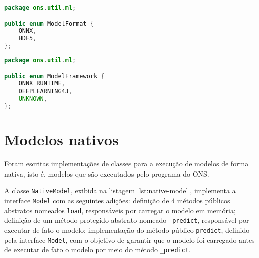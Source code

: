 \begin{lstlisting}[language=Java, caption=Implementação do \textit{enum} ModelFormat, label={lst:modelfr}]
package ons.util.ml;

public enum ModelFormat {
    ONNX,
    HDF5,
};  
\end{lstlisting}

\begin{lstlisting}[language=Java, caption=Implementação do \textit{enum} ModelFramework, label={lst:modelfrm}]
package ons.util.ml;

public enum ModelFramework {
    ONNX_RUNTIME,
    DEEPLEARNING4J,
    UNKNOWN,
};
\end{lstlisting}

\section{Modelos nativos}
\label{appendix-ons-native-model}

Foram escritas implementações de classes para a execução de modelos de forma nativa, isto é, modelos que são executados pelo programa do ONS.

A classe \texttt{NativeModel}, exibida na listagem \ref{lst:native-model}, implementa a interface \texttt{Model} com as seguintes adições: definição de 4 métodos públicos abstratos nomeados \texttt{load}, responsáveis por carregar o modelo em memória; definição de um método protegido abstrato nomeado \texttt{\_predict}, responsável por executar de fato o modelo; implementação do método público \texttt{predict}, definido pela interface \texttt{Model}, com o objetivo de garantir que o modelo foi carregado antes de executar de fato o modelo por meio do método \texttt{\_predict}.

